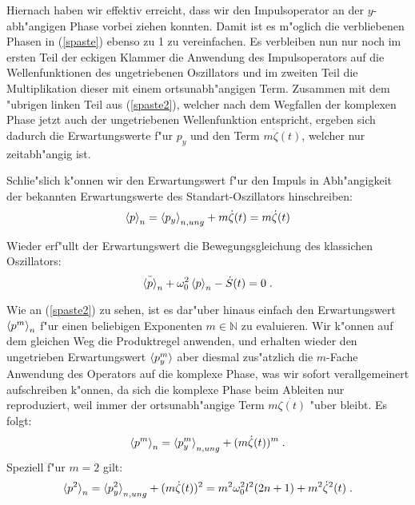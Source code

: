     Hiernach haben wir effektiv erreicht, dass wir den Impulsoperator an der $y$-abh"angigen Phase vorbei ziehen konnten.
    Damit ist es m"oglich die verbliebenen Phasen in (\ref{spaste}) ebenso zu 1 zu vereinfachen.
    Es verbleiben nun nur noch im ersten Teil der eckigen Klammer die Anwendung des Impulsoperators auf die Wellenfunktionen des ungetriebenen Oszillators und im zweiten Teil die Multiplikation dieser mit einem ortsunabh"angigen Term.
    Zusammen mit dem "ubrigen linken Teil aus (\ref{spaste2}), welcher nach dem Wegfallen der komplexen Phase jetzt auch der ungetriebenen Wellenfunktion entspricht, ergeben sich dadurch die Erwartungswerte f"ur $p_y$ und den Term $m\dot{\zeta}(t)$, welcher nur zeitabh"angig ist.

    Schlie"slich k"onnen wir den Erwartungswert f"ur den Impuls in Abh"angigkeit der bekannten Erwartungswerte des Standart-Oszillators hinschreiben:
    \begin{align}
      \braket{p}_n = \braket{p_y}_{n,ung} + m\dot{\zeta}(t) = m\dot{\zeta}(t)
    \end{align}

    Wieder erf"ullt der Erwartungswert die Bewegungsgleichung des klassichen Oszillators:
    \begin{equation}
      \ddot{\braket{p}}_n + \omega_0^2\braket{p}_n - \dot{S}(t) = 0 \; .
    \end{equation}

    Wie an (\ref{spaste2}) zu sehen, ist es dar"uber hinaus einfach den Erwartungswert $\braket{p^m}_n$ f"ur einen beliebigen Exponenten $m \in \mathbb{N}$ zu evaluieren.
    Wir k"onnen auf dem gleichen Weg die Produktregel anwenden, und erhalten wieder den ungetrieben Erwartungswert $\braket{p^m_y}$ aber diesmal zus"atzlich die $m$-Fache Anwendung des Operators auf die komplexe Phase, was wir sofort verallgemeinert aufschreiben k"onnen, da sich die komplexe Phase beim Ableiten nur reproduziert, weil immer der ortsunabh"angige Term $m\dot{\zeta(t)}$ "uber bleibt.
    Es folgt:
    \begin{equation}
      \braket{p^m}_n = \braket{p^m_y}_{n,ung} + (m\dot{\zeta}(t))^m \; .
    \end{equation}
    Speziell f"ur $m=2$ gilt:
    \begin{equation}
      \braket{p^2}_n = \braket{p^2_y}_{n,ung} + (m\dot{\zeta}(t))^2 = m^2\omega^2_0 l^2(2n+1) + m^2\dot{\zeta}^2(t) \; .
    \end{equation}


